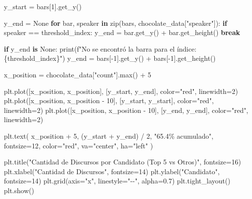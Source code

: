 \documentclass[
  letterpaper,
  DIV=11,
  numbers=noendperiod]{scrartcl}
\newenvironment{Shaded}{\begin{snugshade}}{\end{snugshade}}
\newcommand{\BuiltInTok}[1]{\textcolor[rgb]{0.00,0.23,0.31}{#1}}
\newcommand{\ControlFlowTok}[1]{\textcolor[rgb]{0.00,0.23,0.31}{\textbf{#1}}}
\newcommand{\DecValTok}[1]{\textcolor[rgb]{0.68,0.00,0.00}{#1}}
\newcommand{\FloatTok}[1]{\textcolor[rgb]{0.68,0.00,0.00}{#1}}
\newcommand{\KeywordTok}[1]{\textcolor[rgb]{0.00,0.23,0.31}{\textbf{#1}}}
\newcommand{\NormalTok}[1]{\textcolor[rgb]{0.00,0.23,0.31}{#1}}
\newcommand{\OperatorTok}[1]{\textcolor[rgb]{0.37,0.37,0.37}{#1}}
\newcommand{\SpecialCharTok}[1]{\textcolor[rgb]{0.37,0.37,0.37}{#1}}
\newcommand{\SpecialStringTok}[1]{\textcolor[rgb]{0.13,0.47,0.30}{#1}}
\newcommand{\StringTok}[1]{\textcolor[rgb]{0.13,0.47,0.30}{#1}}
\newcommand{\VariableTok}[1]{\textcolor[rgb]{0.07,0.07,0.07}{#1}}
\begin{document}
\begin{Shaded}
\begin{Highlighting}[]
\NormalTok{y\_start }\OperatorTok{=}\NormalTok{ bars[}\DecValTok{1}\NormalTok{].get\_y()}


\NormalTok{y\_end }\OperatorTok{=} \VariableTok{None}
\ControlFlowTok{for}\NormalTok{ bar, speaker }\KeywordTok{in} \BuiltInTok{zip}\NormalTok{(bars, chocolate\_data[}\StringTok{"speaker"}\NormalTok{]):}
    \ControlFlowTok{if}\NormalTok{ speaker }\OperatorTok{==}\NormalTok{ threshold\_index:}
\NormalTok{        y\_end }\OperatorTok{=}\NormalTok{ bar.get\_y() }\OperatorTok{+}\NormalTok{ bar.get\_height()}
        \ControlFlowTok{break}

\ControlFlowTok{if}\NormalTok{ y\_end }\KeywordTok{is} \VariableTok{None}\NormalTok{:}
    \BuiltInTok{print}\NormalTok{(}\SpecialStringTok{f"No se encontró la barra para el índice: }\SpecialCharTok{\{}\NormalTok{threshold\_index}\SpecialCharTok{\}}\SpecialStringTok{"}\NormalTok{)}
\NormalTok{    y\_end }\OperatorTok{=}\NormalTok{ bars[}\OperatorTok{{-}}\DecValTok{1}\NormalTok{].get\_y() }\OperatorTok{+}\NormalTok{ bars[}\OperatorTok{{-}}\DecValTok{1}\NormalTok{].get\_height()}

\NormalTok{x\_position }\OperatorTok{=}\NormalTok{ chocolate\_data[}\StringTok{"count"}\NormalTok{].}\BuiltInTok{max}\NormalTok{() }\OperatorTok{+} \DecValTok{5}  


\NormalTok{plt.plot([x\_position, x\_position], [y\_start, y\_end], color}\OperatorTok{=}\StringTok{"red"}\NormalTok{, linewidth}\OperatorTok{=}\DecValTok{2}\NormalTok{)  }
\NormalTok{plt.plot([x\_position, x\_position }\OperatorTok{{-}} \DecValTok{10}\NormalTok{], [y\_start, y\_start], color}\OperatorTok{=}\StringTok{"red"}\NormalTok{, linewidth}\OperatorTok{=}\DecValTok{2}\NormalTok{)  }
\NormalTok{plt.plot([x\_position, x\_position }\OperatorTok{{-}} \DecValTok{10}\NormalTok{], [y\_end, y\_end], color}\OperatorTok{=}\StringTok{"red"}\NormalTok{, linewidth}\OperatorTok{=}\DecValTok{2}\NormalTok{)  }


\NormalTok{plt.text(}
\NormalTok{    x\_position }\OperatorTok{+} \DecValTok{5}\NormalTok{, (y\_start }\OperatorTok{+}\NormalTok{ y\_end) }\OperatorTok{/} \DecValTok{2}\NormalTok{, }
    \StringTok{"65.4\% acumulado"}\NormalTok{, fontsize}\OperatorTok{=}\DecValTok{12}\NormalTok{, color}\OperatorTok{=}\StringTok{"red"}\NormalTok{, va}\OperatorTok{=}\StringTok{"center"}\NormalTok{, ha}\OperatorTok{=}\StringTok{"left"}
\NormalTok{)}


\NormalTok{plt.title(}\StringTok{"Cantidad de Discursos por Candidato (Top 5 vs Otros)"}\NormalTok{, fontsize}\OperatorTok{=}\DecValTok{16}\NormalTok{)}
\NormalTok{plt.xlabel(}\StringTok{"Cantidad de Discursos"}\NormalTok{, fontsize}\OperatorTok{=}\DecValTok{14}\NormalTok{)}
\NormalTok{plt.ylabel(}\StringTok{"Candidato"}\NormalTok{, fontsize}\OperatorTok{=}\DecValTok{14}\NormalTok{)}
\NormalTok{plt.grid(axis}\OperatorTok{=}\StringTok{"x"}\NormalTok{, linestyle}\OperatorTok{=}\StringTok{"{-}{-}"}\NormalTok{, alpha}\OperatorTok{=}\FloatTok{0.7}\NormalTok{)}
\NormalTok{plt.tight\_layout()}
\NormalTok{plt.show()}
\end{Highlighting}
\end{Shaded}
\end{document}
